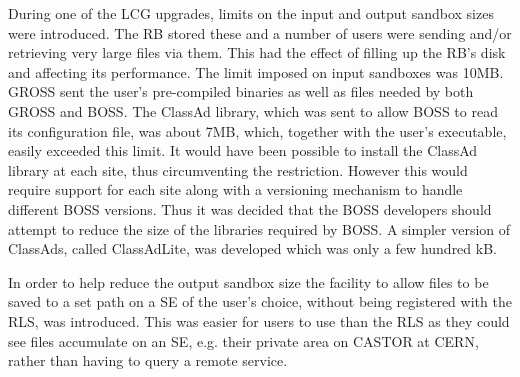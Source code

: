 
During one of the LCG upgrades, limits on the input and output sandbox sizes were introduced. The RB stored these and a number of users were sending and/or retrieving very large files via them. This had the effect of filling up the RB's disk and affecting its performance. The limit imposed on input sandboxes was 10MB. GROSS sent the user's pre-compiled binaries as well as files needed by both GROSS and BOSS. The ClassAd library, which was sent to allow BOSS to read its configuration file, was about 7MB, which, together with the user's executable, easily exceeded this limit. It would have been possible to install the ClassAd library at each site, thus circumventing the restriction. However this would require support for each site along with a versioning mechanism to handle different BOSS versions. Thus it was decided that the BOSS developers should attempt to reduce the size of the libraries required by BOSS. A simpler version of ClassAds, called ClassAdLite, was developed which was only a few hundred kB.

In order to help reduce the output sandbox size the facility to allow files to be saved to a set path on a SE of the user's choice, without being registered with the RLS, was introduced. This was easier for users to use than the RLS as they could see files accumulate on an SE, e.g. their private area on CASTOR at CERN, rather than having to query a remote service.

